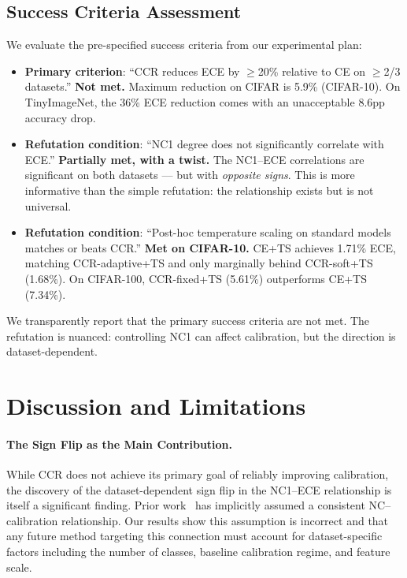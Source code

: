 \documentclass{article}
\begin{document}
\subsection{Success Criteria Assessment}

We evaluate the pre-specified success criteria from our experimental plan:

\begin{itemize}
    \item \textbf{Primary criterion}: ``CCR reduces ECE by $\geq$20\% relative to CE on $\geq$2/3 datasets.'' \textbf{Not met.} Maximum reduction on CIFAR is 5.9\% (CIFAR-10). On TinyImageNet, the 36\% ECE reduction comes with an unacceptable 8.6pp accuracy drop.
    \item \textbf{Refutation condition}: ``NC1 degree does not significantly correlate with ECE.'' \textbf{Partially met, with a twist.} The NC1--ECE correlations are significant on both datasets --- but with \emph{opposite signs}. This is more informative than the simple refutation: the relationship exists but is not universal.
    \item \textbf{Refutation condition}: ``Post-hoc temperature scaling on standard models matches or beats CCR.'' \textbf{Met on CIFAR-10.} CE+TS achieves 1.71\% ECE, matching CCR-adaptive+TS and only marginally behind CCR-soft+TS (1.68\%). On CIFAR-100, CCR-fixed+TS (5.61\%) outperforms CE+TS (7.34\%).
\end{itemize}

We transparently report that the primary success criteria are not met. The refutation is nuanced: controlling NC1 can affect calibration, but the direction is dataset-dependent.

\section{Discussion and Limitations}
\label{sec:discussion}

\paragraph{The Sign Flip as the Main Contribution.}
While CCR does not achieve its primary goal of reliably improving calibration, the discovery of the dataset-dependent sign flip in the NC1--ECE relationship is itself a significant finding. Prior work~\citep{guo2025cross, harun2025controlling} has implicitly assumed a consistent NC--calibration relationship. Our results show this assumption is incorrect and that any future method targeting this connection must account for dataset-specific factors including the number of classes, baseline calibration regime, and feature scale.
\end{document}
